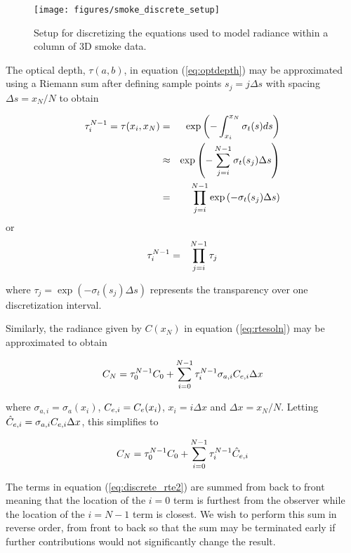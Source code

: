 \begin{figure}[\figoptions]
\begin{center}
\texttt{[image: figures/smoke\_discrete\_setup]}
\end{center}
\caption {Setup for discretizing the equations used to model
radiance within a column of 3D smoke data.}
\label{fig:smokediscretesetup}
\end{figure}

The optical depth, $\tau(a,b)$, in equation (\ref{eq:optdepth}) may be approximated using a Riemann sum  after defining sample points $s_j=j\Delta s$ with spacing $\Delta s=x_N/N$ to obtain

\begin{eqnarray*}
\tau_{i}^{N-1}=\tau(x_i,x_N)&=&\exp\left(-\int_{x_i}^{x_N}\sigma_t(s)ds\right)\\
&\approx&\exp\left(-\sum_{j=i}^{N-1}\sigma_t(s_j)\Delta s\right)\\
&=&\prod_{j=i}^{N-1}\exp\left(-\sigma_t(s_j)\Delta s\right)
\end{eqnarray*}
or
\begin{eqnarray}
\label{eq:tauhat_discrete}
\tau_{i}^{N-1}&=&\prod_{j=i}^{N-1}\tau_j
\end{eqnarray}

where $\tau_j=\exp\left(-\sigma_t(s_j)\Delta s\right)$ represents the transparency over one discretization interval.

Similarly, the radiance given by $C(x_N)$ in equation (\ref{eq:rtesoln}) may be approximated to obtain

\begin{equation}
\label{eq:discrete_rte}
C_{N} = \tau_{0}^{N-1}C_0 +
\sum_{i=0}^{N-1}\tau_{i}^{N-1}\sigma_{a,i}C_{e,i}\Delta x
\end{equation}

where $\sigma_{a,i}=\sigma_a(x_i)$, $C_{e,i}=C_e(x_i)$, $x_i=i\Delta x$ and $\Delta x=x_N/N$.
Letting $\hat{C}_{e,i}=\sigma_{a,i}C_{e,i}\Delta x$, this simplifies to

\begin{equation}
\label{eq:discrete_rte2}
C_N = \tau_{0}^{N-1}C_0 + \sum_{i=0}^{N-1}\tau_{i}^{N-1}\hat{C}_{e,i}
\end{equation}

The terms in equation (\ref{eq:discrete_rte2}) are summed from back to front meaning that the location of the $i=0$ term is furthest from the observer while the location of the $i=N-1$ term is closest.  We wish to perform this sum in reverse order, from front to back so that the sum may be terminated early if further contributions would not significantly change the result.

